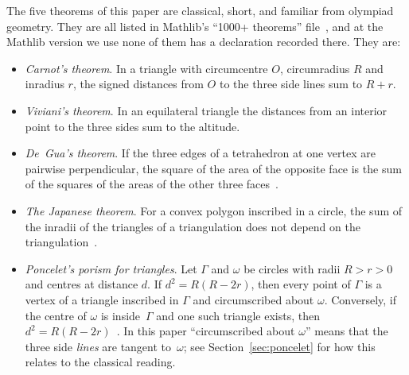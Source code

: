 \documentclass[11pt]{article}
\theoremstyle{definition}
\theoremstyle{remark}
\begin{document}
The five theorems of this paper are classical, short, and familiar from olympiad geometry.
They are all listed in Mathlib's ``1000+ theorems'' file~\cite{Mathlib1000}, and at the Mathlib
version we use none of them has a declaration recorded there. They are:
\begin{itemize}
\item \emph{Carnot's theorem}. In a triangle with circumcentre $O$, circumradius $R$ and
inradius $r$, the signed distances from $O$ to the three side lines sum to $R+r$.
\item \emph{Viviani's theorem}. In an equilateral triangle the distances from an interior point to
the three sides sum to the altitude.
\item \emph{De~Gua's theorem}. If the three edges of a tetrahedron at one vertex are pairwise
perpendicular, the square of the area of the opposite face is the sum of the squares of the areas
of the other three faces~\cite{ConantBeyer}.
\item \emph{The Japanese theorem}. For a convex polygon inscribed in a circle, the sum of the
inradii of the triangles of a triangulation does not depend on the triangulation~\cite{FukagawaPedoe}.
\item \emph{Poncelet's porism for triangles}. Let $\Gamma$ and $\omega$ be circles with radii
$R>r>0$ and centres at distance $d$. If $d^2=R(R-2r)$, then every point of $\Gamma$ is a vertex of a
triangle inscribed in $\Gamma$ and circumscribed about $\omega$. Conversely, if the centre of
$\omega$ is inside~$\Gamma$ and one such triangle exists, then $d^2=R(R-2r)$~\cite{Flatto}.
In this paper ``circumscribed about $\omega$'' means that the three side \emph{lines} are tangent
to~$\omega$; see Section~\ref{sec:poncelet} for how this relates to the classical reading.
\end{itemize}
\end{document}
